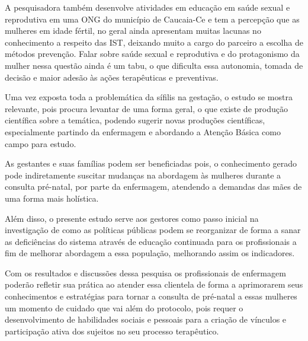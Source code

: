 A pesquisadora também desenvolve atividades em educação em saúde sexual e reprodutiva em uma \acrshort{ONG} do município de Caucaia-Ce e tem a percepção que as mulheres em idade fértil, no geral ainda apresentam muitas lacunas no conhecimento a respeito das IST, deixando muito a cargo do parceiro a escolha de métodos prevenção. Falar sobre saúde sexual e reprodutiva e do protagonismo da mulher nessa questão ainda é um tabu, o que dificulta essa autonomia, tomada de decisão e maior adesão às ações terapêuticas e preventivas.

Uma vez exposta toda a problemática da sífilis na gestação, o estudo se mostra relevante, pois procura levantar de uma forma geral, o que existe de produção científica sobre a temática, podendo sugerir novas produções científicas, especialmente partindo da enfermagem e abordando a Atenção Básica como campo para estudo. 

As gestantes e suas famílias podem ser beneficiadas pois, o conhecimento gerado pode indiretamente suscitar mudanças na abordagem às mulheres durante a consulta pré-natal, por parte da enfermagem, atendendo a demandas das mães de uma forma mais holística.

Além disso, o presente estudo serve aos gestores como passo inicial na investigação de como as políticas públicas podem se reorganizar de forma a sanar as deficiências do sistema através de educação continuada para os profissionais a fim de melhorar abordagem a essa população, melhorando assim os indicadores.

Com os resultados e discussões dessa pesquisa os profissionais de enfermagem poderão refletir sua prática ao atender essa clientela de forma a aprimorarem seus conhecimentos e estratégias para tornar a consulta de pré-natal a essas mulheres um momento de cuidado que vai além do protocolo, pois requer o desenvolvimento de habilidades sociais e pessoais para a criação de vínculos e participação ativa dos sujeitos no seu processo terapêutico.




